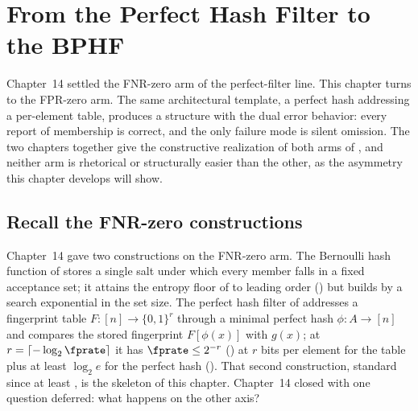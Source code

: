 %

\section{From the Perfect Hash Filter to the BPHF}
\label{sec:bhf-to-bphf}

Chapter~14 settled the FNR-zero arm of the perfect-filter line. This
chapter turns to the FPR-zero arm. The same architectural template, a
perfect hash addressing a per-element table, produces a structure with
the dual error behavior: every report of membership is correct, and the
only failure mode is silent omission. The two chapters together give the
constructive realization of both arms of
, and neither arm is rhetorical or
structurally easier than the other, as the asymmetry this chapter
develops will show.

\subsection*{Recall the FNR-zero constructions}

Chapter~14 gave two constructions on the FNR-zero arm. The Bernoulli hash
function of  stores a single salt under which every member
falls in a fixed acceptance set; it attains the entropy floor of
 to leading order () but
builds by a search exponential in the set size. The perfect hash filter
of  addresses a fingerprint table $F : [n] \to \{0, 1\}^r$
through a minimal perfect hash $\phi : A \to [n]$ and compares the stored
fingerprint $F[\phi(x)]$ with $g(x)$; at $r = \lceil -\log_2 \fprate
\rceil$ it has $\fprate \le 2^{-r}$ () at $r$ bits per
element for the table plus at least $\log_2 e$ for the perfect hash
(). That second construction, standard since at
least \textcite[Sec.~1]{dietzfelbinger-pagh-2008}, is the skeleton of
this chapter. Chapter~14 closed with one question deferred: what happens
on the other axis?


